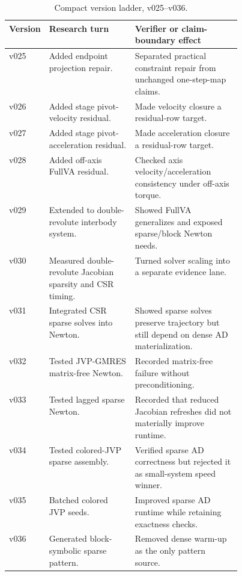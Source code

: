 \documentclass[10pt]{article}
\begin{document}
\begin{table}[H]
\centering
\caption{Compact version ladder, v025--v036.}
\label{tab:version_ladder_c}
\scriptsize
\begin{tabularx}{\linewidth}{p{0.08\linewidth}p{0.37\linewidth}Y}
\toprule
\textbf{Version} & \textbf{Research turn} & \textbf{Verifier or claim-boundary effect} \\
\midrule
v025 & Added endpoint projection repair. & Separated practical constraint repair from unchanged one-step-map claims. \\
v026 & Added stage pivot-velocity residual. & Made velocity closure a residual-row target. \\
v027 & Added stage pivot-acceleration residual. & Made acceleration closure a residual-row target. \\
v028 & Added off-axis FullVA residual. & Checked axis velocity/acceleration consistency under off-axis torque. \\
v029 & Extended to double-revolute interbody system. & Showed FullVA generalizes and exposed sparse/block Newton needs. \\
v030 & Measured double-revolute Jacobian sparsity and CSR timing. & Turned solver scaling into a separate evidence lane. \\
v031 & Integrated CSR sparse solves into Newton. & Showed sparse solves preserve trajectory but still depend on dense AD materialization. \\
v032 & Tested JVP-GMRES matrix-free Newton. & Recorded matrix-free failure without preconditioning. \\
v033 & Tested lagged sparse Newton. & Recorded that reduced Jacobian refreshes did not materially improve runtime. \\
v034 & Tested colored-JVP sparse assembly. & Verified sparse AD correctness but rejected it as small-system speed winner. \\
v035 & Batched colored JVP seeds. & Improved sparse AD runtime while retaining exactness checks. \\
v036 & Generated block-symbolic sparse pattern. & Removed dense warm-up as the only pattern source. \\
\bottomrule
\end{tabularx}
\end{table}
\end{document}

